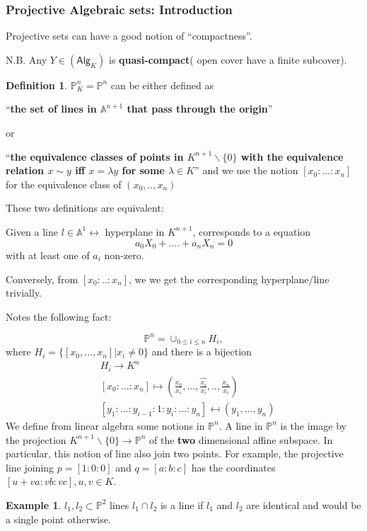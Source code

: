 \documentclass[11pt]{article}
\theoremstyle{definition}
\newtheorem{dfn}[thm]{Definition}
\newtheorem{ex}[thm]{Example}
\newcommand{\affn}{\mathbb A}
\newcommand{\proj}{\mathbb P}
\newcommand{\lrta}{\longrightarrow}
\newcommand{\llrta}{\longleftrightarrow}
\begin{document}
\subsubsection{Projective Algebraic sets: Introduction}

Projective sets can have a good notion of ``compactness''.

N.B. Any $Y\in (\mathsf{Alg}_K)$ is \textbf{quasi-compact}( open cover have a finite subcover).

\begin{dfn}
$\proj^n_K=\proj^n$ can be either defined as 

``\textbf{the set of  lines in $\affn^{n+1}$ that pass through the origin}''

or

``\textbf{the equivalence classes of points in $K^{n+1}\backslash \{0\}$ with the equivalence relation $x\sim y$ iff $x=\lambda y$ for some $\lambda \in K$}'' and we use the notion $[x_0:...:x_n]$ for the equivalence class of $(x_0,..,x_n)$
\end{dfn}

These two definitions are equivalent: 

Given a line $l\in \affn^1\llrta $ hyperplane in $K^{n+1}$, corresponds to a equation
$$
a_0X_0+....+a_n X_n=0
$$
with at least one of $a_i$ non-zero.

Conversely, from $[x_0:..:x_n]$, we  we get the corresponding hyperplane/line trivially.


Notes the following fact:

$$
\proj^n=\cup_{0\leq i\leq n} H_i,
$$
where $H_i=\{[x_0,...,x_n]|x_i\neq 0\}$ and there is a bijection 
$$
\begin{aligned}
&H_i\lrta K^n\\
&[x_0:...:x_n]\longmapsto\left(\frac{x_0}{x_i},...,\widehat{\frac{x_i}{x_i}},..,\frac{x_n}{x_i}\right)\\
&
[y_1:...:y_{i-1}:1:y_{i}:...:y_n]\mapsfrom(y_1,...,y_n)
\end{aligned}
$$
We define from linear algebra some notions in $\proj^n$. A line in $\proj^n$ is the image by the projection $K^{n+1}\backslash \{0\}\lrta \proj^n$ of the \textbf{two} dimensional affine subspace. In particular, this notion of line also join two points. For example, the projective line joining $p=[1:0:0]$ and $q=[a:b:c]$ has the coordinates
$[u+va:vb:vc], u,v\in K$.

\begin{ex}
$l_1,l_2\subset \proj^2$ lines $l_1\cap l_2$ is a line if $l_1$ and $l_2$ are identical and would be a single point otherwise.
\end{ex}
\end{document}
